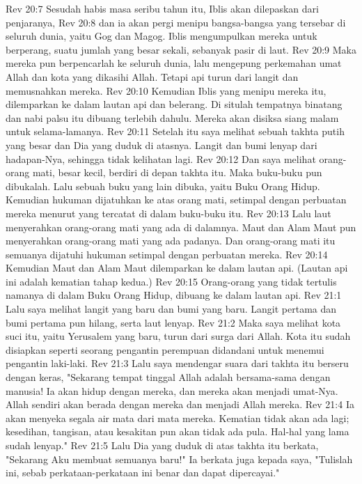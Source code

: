 Rev 20:7  Sesudah habis masa seribu tahun itu, Iblis akan dilepaskan dari penjaranya,
Rev 20:8  dan ia akan pergi menipu bangsa-bangsa yang tersebar di seluruh dunia, yaitu Gog dan Magog. Iblis mengumpulkan mereka untuk berperang, suatu jumlah yang besar sekali, sebanyak pasir di laut.
Rev 20:9  Maka mereka pun berpencarlah ke seluruh dunia, lalu mengepung perkemahan umat Allah dan kota yang dikasihi Allah. Tetapi api turun dari langit dan memusnahkan mereka.
Rev 20:10  Kemudian Iblis yang menipu mereka itu, dilemparkan ke dalam lautan api dan belerang. Di situlah tempatnya binatang dan nabi palsu itu dibuang terlebih dahulu. Mereka akan disiksa siang malam untuk selama-lamanya.
Rev 20:11  Setelah itu saya melihat sebuah takhta putih yang besar dan Dia yang duduk di atasnya. Langit dan bumi lenyap dari hadapan-Nya, sehingga tidak kelihatan lagi.
Rev 20:12  Dan saya melihat orang-orang mati, besar kecil, berdiri di depan takhta itu. Maka buku-buku pun dibukalah. Lalu sebuah buku yang lain dibuka, yaitu Buku Orang Hidup. Kemudian hukuman dijatuhkan ke atas orang mati, setimpal dengan perbuatan mereka menurut yang tercatat di dalam buku-buku itu.
Rev 20:13  Lalu laut menyerahkan orang-orang mati yang ada di dalamnya. Maut dan Alam Maut pun menyerahkan orang-orang mati yang ada padanya. Dan orang-orang mati itu semuanya dijatuhi hukuman setimpal dengan perbuatan mereka.
Rev 20:14  Kemudian Maut dan Alam Maut dilemparkan ke dalam lautan api. (Lautan api ini adalah kematian tahap kedua.)
Rev 20:15  Orang-orang yang tidak tertulis namanya di dalam Buku Orang Hidup, dibuang ke dalam lautan api.
Rev 21:1  Lalu saya melihat langit yang baru dan bumi yang baru. Langit pertama dan bumi pertama pun hilang, serta laut lenyap.
Rev 21:2  Maka saya melihat kota suci itu, yaitu Yerusalem yang baru, turun dari surga dari Allah. Kota itu sudah disiapkan seperti seorang pengantin perempuan didandani untuk menemui pengantin laki-laki.
Rev 21:3  Lalu saya mendengar suara dari takhta itu berseru dengan keras, "Sekarang tempat tinggal Allah adalah bersama-sama dengan manusia! Ia akan hidup dengan mereka, dan mereka akan menjadi umat-Nya. Allah sendiri akan berada dengan mereka dan menjadi Allah mereka.
Rev 21:4  Ia akan menyeka segala air mata dari mata mereka. Kematian tidak akan ada lagi; kesedihan, tangisan, atau kesakitan pun akan tidak ada pula. Hal-hal yang lama sudah lenyap."
Rev 21:5  Lalu Dia yang duduk di atas takhta itu berkata, "Sekarang Aku membuat semuanya baru!" Ia berkata juga kepada saya, "Tulislah ini, sebab perkataan-perkataan ini benar dan dapat dipercayai."
